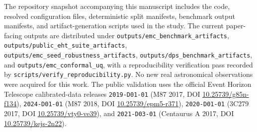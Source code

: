 \documentclass[fleqn,usenatbib]{mnras}
\begin{document}
The repository snapshot accompanying this manuscript includes the code, resolved configuration files, deterministic split manifests, benchmark output manifests, and artifact-generation scripts used in the study. The current paper-facing outputs are distributed under \texttt{outputs/emc\_benchmark\_artifacts}, \texttt{outputs/public\_eht\_suite\_artifacts}, \texttt{outputs/emc\_seed\_robustness\_artifacts}, \texttt{outputs/dps\_benchmark\_artifacts}, and \texttt{outputs/emc\_conformal\_uq}, with a reproducibility verification pass recorded by \texttt{scripts/verify\_reproducibility.py}. No new real astronomical observations were acquired for this work. The public validation uses the official Event Horizon Telescope calibrated-data releases \texttt{2019-D01-01} (M87 2017, DOI \href{https://doi.org/10.25739/g85n-f134}{10.25739/g85n-f134}), \texttt{2024-D01-01} (M87 2018, DOI \href{https://doi.org/10.25739/epm5-r371}{10.25739/epm5-r371}), \texttt{2020-D01-01} (3C279 2017, DOI \href{https://doi.org/10.25739/vty0-ve39}{10.25739/vty0-ve39}), and \texttt{2021-D03-01} (Centaurus A 2017, DOI \href{https://doi.org/10.25739/kejs-2n22}{10.25739/kejs-2n22}).

\balance



\label{lastpage}
\end{document}
